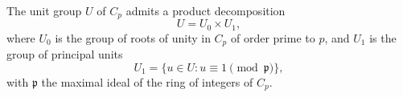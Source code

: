 The unit group $U$ of $C_p$ admits a product decomposition
$$
U = U_0 \times U_1,
$$
where $U_0$ is the group of roots of unity in $C_p$ of order prime to $p$, and $U_1$ is the group of principal units
$$
U_1 = \{ u \in U : u \equiv 1 \pmod{\mathfrak{p}} \},
$$
with $\mathfrak{p}$ the maximal ideal of the ring of integers of $C_p$.
